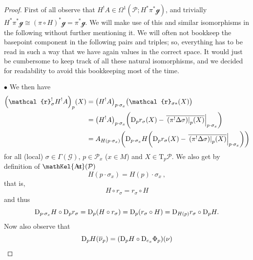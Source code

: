 \documentclass[reqno,a4paper,oneside]{amsart}
\theoremstyle{plain}
\theoremstyle{remark}
\theoremstyle{definition}
\DeclareMathOperator{\sAut}{\mathKel{A\mkern-5.5mu u\mkern-4mu t\mkern-1.5mu}}
\begin{document}
\begin{proof}
\leavevmode\newline
First of all observe that $H^!A \in \Omega^1(\mathcal{P}; H^*\pi^*\mathcal{g})$, and trivially $H^*\pi^*\mathcal{g} \cong (\pi\circ H)^*\mathcal{g} = \pi^*\mathcal{g}$. We will make use of this and similar isomorphisms in the following without further mentioning it. We will often not bookkeep the basepoint component in the following pairs and triples; so, everything has to be read in such a way that we have again values in the correct space. It would just be cumbersome to keep track of all these natural isomorphisms, and we decided for readability to avoid this bookkeeping most of the time.

$\bullet$ We then have
\begin{align*}
\mleft(\mathcal{r}_\sigma^!H^!A\mright)_p(X)
&=
\mleft( H^!A \mright)_{p \cdot \sigma_x}\bigl(
	\mathcal{r}_{\sigma*}(X)
\bigr)
\\
&=
\mleft( H^!A \mright)_{p \cdot \sigma_x}\mleft(
	\mathrm{D}_pr_\sigma\mleft( 
	X 
\mright)
	- \mleft.{\overline{
		\mleft. \mleft( \pi^!\Delta\sigma \mright) \mright|_p(X)
	}}\mright|_{p \cdot \sigma_{x}}
\mright)
\\
&=
A_{H\mleft(p \cdot \sigma_x\mright)}\mleft( \mathrm{D}_{p \cdot \sigma_x}H\mleft(
	\mathrm{D}_pr_\sigma\mleft( 
	X 
\mright)
	- \mleft.{\overline{
		\mleft. \mleft( \pi^!\Delta\sigma \mright) \mright|_p(X)
	}}\mright|_{p \cdot \sigma_{x}}
\mright)\mright)
\end{align*}
for all (local) $\sigma \in \Gamma(\mathcal{G})$, $p \in \mathcal{P}_x$ ($x \in M$) and $X \in \mathrm{T}_p\mathcal{P}$. We also get by definition of $\sAut(\mathcal{P})$
\begin{equation*}
H(p \cdot \sigma_x)
=
H(p) \cdot \sigma_x~,
\end{equation*}
that is,
\begin{equation*}
H\circ r_\sigma
=
r_\sigma \circ H
\end{equation*}
and thus
\begin{equation*}
\mathrm{D}_{p\cdot \sigma_x}H \circ \mathrm{D}_p r_\sigma
=
\mathrm{D}_p \mleft( H \circ r_\sigma \mright)
=
\mathrm{D}_p \mleft( r_\sigma \circ H \mright)
=
\mathrm{D}_{H(p)} r_\sigma \circ \mathrm{D}_pH.
\end{equation*}
Now also observe that
\begin{equation}\label{GaugeTrafoDiffOnFUndVect}
\mathrm{D}_p H \mleft( \overline{\nu}_p \mright)
=
\mleft(\mathrm{D}_p H \circ \mathrm{D}_{e_x}\Phi_p\mright) (\nu)

\end{equation}
\end{proof}
\end{document}
